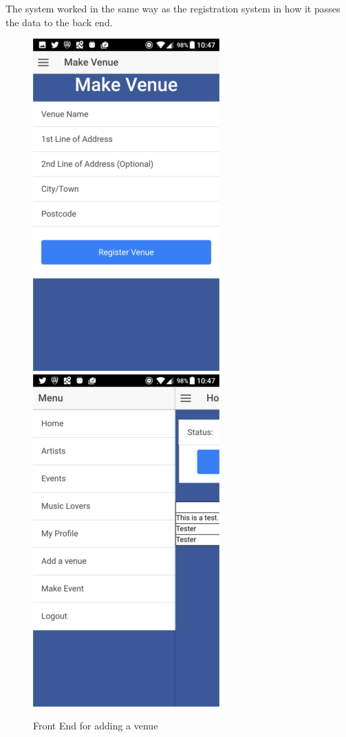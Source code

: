 The system worked in the same way as the registration system in how it passes the data to the back end.
\begin{center}
\begin{figure}[H]
\begin{center}
\includegraphics[scale=0.5]{images/sc12}
\includegraphics[scale=0.5]{images/sc13}
\end{center}
\caption{Front End for adding a venue}
\end{figure}
\end{center}

